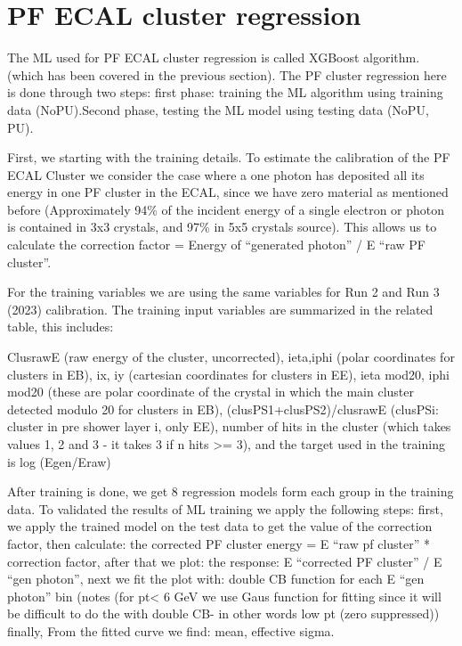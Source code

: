 \section{PF ECAL cluster regression}
The ML used for PF ECAL cluster regression is called XGBoost algorithm. (which has been covered in the previous section). The PF cluster regression here is done through two steps: first phase: training the ML algorithm using training data (NoPU).Second phase, testing the ML model using testing data (NoPU, PU).

First, we starting with the training details. To estimate the calibration of the PF ECAL Cluster we consider the case where a one photon has deposited all its energy in one PF cluster in the ECAL, since we have zero material as mentioned before (Approximately 94\% of the incident energy of a single electron or photon is contained in 3x3 crystals, and 97\% in 5x5 crystals source).
This allows us to calculate the correction factor = Energy of “generated photon” / E “raw PF cluster”.

For the training variables we are using the same variables for Run 2 and Run 3 (2023) calibration. The training input variables are summarized in the related table, this includes:

ClusrawE (raw energy of the cluster, uncorrected),
ieta,iphi (polar coordinates for clusters in EB),
ix, iy (cartesian coordinates for clusters in EE),
ieta mod20, iphi mod20 (these are polar coordinate of the crystal in which the main cluster detected modulo 20 for clusters in EB),
(clusPS1+clusPS2)/clusrawE (clusPSi: cluster in pre shower layer i, only EE),
 number of hits in the cluster (which takes values 1, 2 and 3 - it takes 3 if n hits >= 3),
and the target used in the training is log (Egen/Eraw)

After training is done, we get 8 regression models form each group in the training data. To validated the results of ML training we apply the following steps:
first, we apply the trained model on the test data to get the value of the correction factor,
then calculate:  the corrected PF cluster energy = E “raw pf cluster” * correction factor,
after that we plot: the response: E “corrected PF cluster” / E “gen photon”,
next we fit the plot with: double CB function for each E “gen photon” bin (notes (for pt< 6 GeV we use Gaus function for fitting since it will be difficult to do the with double CB- in other words low pt (zero suppressed))
finally, From the fitted curve we find: mean, effective sigma.

